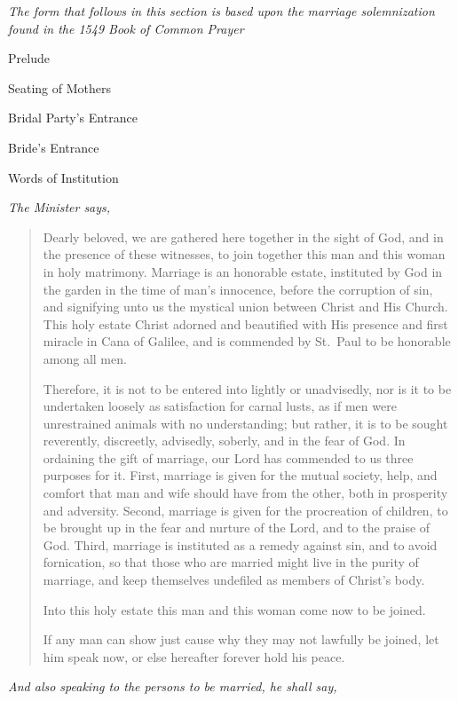 \documentclass[
]{book}
\begin{document}
\emph{The form that follows in this section is based upon the marriage solemnization found in the 1549 Book of Common Prayer}

Prelude

Seating of Mothers

Bridal Party's Entrance

Bride's Entrance

Words of Institution

\begin{center}
\emph{The Minister says,}

\end{center}

\begin{quote}
Dearly beloved, we are gathered here together in the sight of God, and in the presence of these witnesses, to join together this man and this woman in holy matrimony. Marriage is an honorable estate, instituted by God in the garden in the time of man's innocence, before the corruption of sin, and signifying unto us the mystical union between Christ and His Church. This holy estate Christ adorned and beautified with His presence and first miracle in Cana of Galilee, and is commended by St.~Paul to be honorable among all men.

Therefore, it is not to be entered into lightly or unadvisedly, nor is it to be undertaken loosely as satisfaction for carnal lusts, as if men were unrestrained animals with no understanding; but rather, it is to be sought reverently, discreetly, advisedly, soberly, and in the fear of God. In ordaining the gift of marriage, our Lord has commended to us three purposes for it. First, marriage is given for the mutual society, help, and comfort that man and wife should have from the other, both in prosperity and adversity. Second, marriage is given for the procreation of children, to be brought up in the fear and nurture of the Lord, and to the praise of God. Third, marriage is instituted as a remedy against sin, and to avoid fornication, so that those who are married might live in the purity of marriage, and keep themselves undefiled as members of Christ's body.

Into this holy estate this man and this woman come now to be joined.

If any man can show just cause why they may not lawfully be joined, let him speak now, or else hereafter forever hold his peace.
\end{quote}

\emph{And also speaking to the persons to be married, he shall say,}
\end{document}
